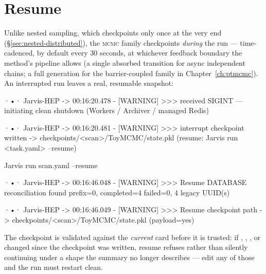 \section{Resume}
\label{sec:mcmc-resume}

Unlike nested sampling, which checkpoints only once at the very end
(\S\ref{sec:nested-distributed}), the \textsc{mcmc} family checkpoints
\emph{during} the run --- time-cadenced, by default every $30$ seconds, at whichever
feedback boundary the method's pipeline allows (a single absorbed transition for
async independent chains; a full generation for the barrier-coupled family in
Chapter~\ref{ch:ptmcmc}). An interrupted run leaves a real, resumable snapshot:

\begin{terminal}
\begin{jout}
·•· Jarvis-HEP
	-> 00:16:20.478 - [WARNING] >>>
received SIGINT — initiating clean shutdown (Workers / Archiver / managed Redis)

·•· Jarvis-HEP
	-> 00:16:20.481 - [WARNING] >>>
interrupt checkpoint written -> checkpoints/<scan>/ToyMCMC/state.pkl
(resume: Jarvis run <task.yaml> --resume)
\end{jout}
\end{terminal}

\begin{terminal}
\begin{jcmd}
Jarvis run scan.yaml --resume
\end{jcmd}
\end{terminal}

\begin{terminal}
\begin{jout}
·•· Jarvis-HEP
	-> 00:16:46.048 - [WARNING] >>>
Resume DATABASE reconciliation found prefix=0, completed=4 failed=0, 4 legacy UUID(s)

·•· Jarvis-HEP
	-> 00:16:46.049 - [WARNING] >>>
Resume checkpoint path -> checkpoints/<scan>/ToyMCMC/state.pkl (payload=yes)
\end{jout}
\end{terminal}

\begin{jwarn}
The checkpoint is validated against the \emph{current} card before it is trusted: if
, , , or
 changed since the checkpoint was written, resume refuses rather than
silently continuing under a shape the summary no longer describes --- edit any of
those and the run must restart clean.
\end{jwarn}

